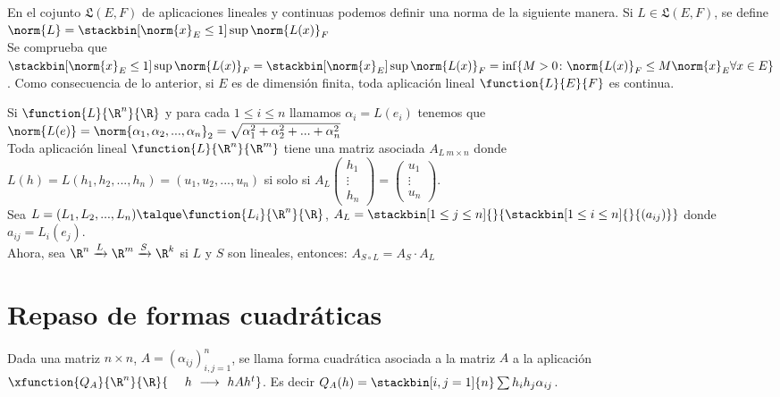 	\begin{observacion}
	En el cojunto $\mathfrak{L}(E,F)$ de aplicaciones lineales y continuas podemos definir una norma de la siguiente manera. Si $L\in\mathfrak{L}(E,F)$, se define $\norm{L}=\stackbin[\norm{x}_E\leq 1]{}\sup\norm{L(x)}_F$\\
	Se comprueba que $\stackbin[\norm{x}_E\leq 1]{}\sup\norm{L(x)}_F=\stackbin[\norm{x}_E]{}\sup\norm{L(x)}_F=\inf\{M>0\colon \norm{L(x)}_F\leq M\norm{x}_E\\ \forall x\in E\}$. Como consecuencia de lo anterior, si $E$ es de dimensión finita, toda aplicación lineal $\function{L}{E}{F}$ es continua.
	\end{observacion}
	
	\begin{observacion} Si $\function{L}{\R^n}{\R}$ y para cada $1\leq i \leq n$ llamamos $\alpha_i=L(e_i)$ tenemos que $\norm{L(e)}=\norm{\alpha_1,\alpha_2,...,\alpha_n}_2=\sqrt{\alpha_1^2+\alpha_2^2+...+\alpha_n^2}$\\	
	Toda aplicación lineal $\function{L}{\R^n}{\R^m}$ tiene una matriz asociada $A_{L\ m\times n}$ donde\\ $L(h)=L(h_1,h_2,...,h_n)=(u_1,u_2,...,u_n)$ si solo si $A_L\begin{pmatrix}
  h_1 \\ \vdots \\ h_n  \end{pmatrix}=\begin{pmatrix}  u_1 \\ \vdots \\ u_n  \end{pmatrix}$.\\
  Sea $L=(L_1,L_2,...,L_n)\talque \function{L_i}{\R^n}{\R}$, $A_L=\stackbin[1\leq j\leq n]{}{\stackbin[1\leq i\leq n]{}{(a_{ij})}}$ donde $a_{ij}=L_i(e_j)$.\\
  Ahora, sea $\R^n\xrightarrow{L}\R^m\xrightarrow{S}\R^k$ si $L$ y $S$ son lineales, entonces: $A_{S\circ L}=A_S\cdot A_L$
	\end{observacion}
	
	\chapter{Repaso de formas cuadráticas} \label{App:AppendixC}

\begin{defi} Dada una matriz $n\times n$, $A=(\alpha_{ij})^n_{i,j=1}$, se llama forma cuadrática asociada a la matriz $A$ a la aplicación $\xfunction{Q_A}{\R^n}{\R}{\ \ \ \ h\ \longrightarrow\ hAh^t}$. Es decir $Q_A(h)=\stackbin[i,j=1]{n}\sum h_ih_j\alpha_{ij}$.
\end{defi}

